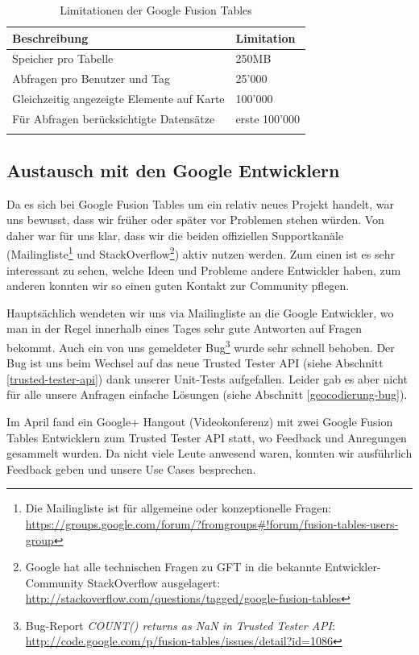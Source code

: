 \begin{longtable}{|l|l|}
\hline 
\textbf{Beschreibung} & \textbf{Limitation} \\ 
\hline 
Speicher pro Tabelle & 250MB \\ 
\hline 
Abfragen pro Benutzer und Tag & 25'000 \\ 
\hline 
Gleichzeitig angezeigte Elemente auf Karte & 100'000 \\ 
\hline 
Für Abfragen berücksichtigte Datensätze & erste 100'000 \\ 
\hline 
\caption{Limitationen der Google Fusion Tables}
\label{gft-limitations}
\end{longtable} 

\subsection{Austausch mit den Google Entwicklern}
\label{austausch-mit-google}
Da es sich bei Google Fusion Tables um ein relativ neues Projekt handelt, war uns bewusst, dass wir früher oder später vor Problemen stehen würden. Von daher war für uns klar, dass wir die beiden offiziellen Supportkanäle (Mailingliste\footnote{Die Mailingliste ist für allgemeine oder konzeptionelle Fragen: \url{https://groups.google.com/forum/?fromgroups\#!forum/fusion-tables-users-group}} und StackOverflow\footnote{Google hat alle technischen Fragen zu GFT in die bekannte Entwickler-Community StackOverflow ausgelagert: \url{http://stackoverflow.com/questions/tagged/google-fusion-tables}}) aktiv nutzen werden. Zum einen ist es sehr interessant zu sehen, welche Ideen und Probleme andere Entwickler haben, zum anderen konnten wir so einen guten Kontakt zur Community pflegen.

Hauptsächlich wendeten wir uns via Mailingliste an die Google Entwickler, wo man in der Regel innerhalb eines Tages sehr gute Antworten auf Fragen bekommt. Auch ein von uns gemeldeter Bug\footnote{Bug-Report \emph{COUNT() returns as NaN in Trusted Tester \gls{API}}: \url{http://code.google.com/p/fusion-tables/issues/detail?id=1086}} wurde sehr schnell behoben. Der Bug ist uns beim Wechsel auf das neue Trusted Tester \gls{API} (siehe Abschnitt \ref{trusted-tester-api}) dank unserer Unit-Tests aufgefallen. Leider gab es aber nicht für alle unsere Anfragen einfache Lösungen (siehe Abschnitt \ref{geocodierung-bug}).

Im April fand ein Google+ Hangout (Videokonferenz) mit zwei Google Fusion Tables Entwicklern zum Trusted Tester \gls{API} statt, wo Feedback und Anregungen gesammelt wurden. Da nicht viele Leute anwesend waren, konnten wir ausführlich Feedback geben und unsere Use Cases besprechen.









